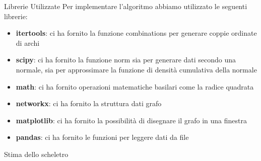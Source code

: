 \documentclass[xcolor ={table,usenames,dvipsnames}]{beamer}
\theoremstyle{definition}
\begin{document}
	\begin{frame}{Librerie Utilizzate}
	Per implementare l'algoritmo abbiamo utilizzato le seguenti librerie:
	\begin{itemize}
		\item \textbf{itertools}: ci ha fornito la funzione combinations per generare coppie ordinate di archi
		\item \textbf{scipy}: ci ha fornito la funzione norm sia per generare dati secondo una normale, sia per approssimare la funzione di densità cumulativa della normale
		\item \textbf{math}: ci ha fornito operazioni matematiche basilari come la radice quadrata
		\item \textbf{networkx}: ci ha fornito la struttura dati grafo
		\item \textbf{matplotlib}: ci ha fornito la possibilità di disegnare il grafo in una finestra
		\item \textbf{pandas}: ci ha fornito le funzioni per leggere dati da file
	\end{itemize}
	\begin{frame}{Stima dello scheletro}
		
	\end{frame}
\end{frame}
\end{document}
